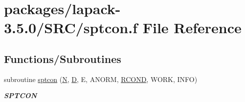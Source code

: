 \hypertarget{sptcon_8f}{}\section{packages/lapack-\/3.5.0/\+S\+R\+C/sptcon.f File Reference}
\label{sptcon_8f}
\subsection*{Functions/\+Subroutines}
\begin{DoxyCompactItemize}
\item 
subroutine \hyperlink{group__realPTcomputational_gabc37c4284bea6237d5f0f08d27d3ebdd}{sptcon} (\hyperlink{polmisc_8c_a0240ac851181b84ac374872dc5434ee4}{N}, \hyperlink{odrpack_8h_a7dae6ea403d00f3687f24a874e67d139}{D}, E, A\+N\+O\+R\+M, \hyperlink{superlu__enum__consts_8h_af00a42ecad444bbda75cde1b64bd7e72a9b5c151728d8512307565994c89919d5}{R\+C\+O\+N\+D}, W\+O\+R\+K, I\+N\+F\+O)
\begin{DoxyCompactList}\small\item\em {\bfseries S\+P\+T\+C\+O\+N} \end{DoxyCompactList}\end{DoxyCompactItemize}
